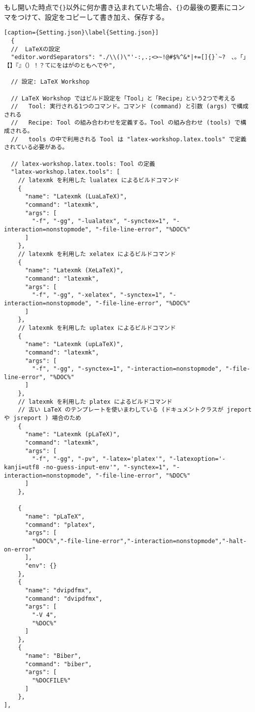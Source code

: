 \documentclass{ltjsarticle}
\begin{document}
もし開いた時点で\verb|{}|以外に何か書き込まれていた場合、\verb|{}|の最後の要素にコンマをつけて、設定をコピーして書き加え、保存する。
\begin{lstlisting}[caption={Setting.json}\label{Setting.json}]
  {
  //  LaTeXの設定
  "editor.wordSeparators": "./\\()\"'-:,.;<>~!@#$%^&*|+=[]{}`~?　、。「」【】『』（）！？てにをはがのともへでや",

  // 設定: LaTeX Workshop

  // LaTeX Workshop ではビルド設定を「Tool」と「Recipe」という2つで考える
  //   Tool: 実行される1つのコマンド。コマンド (command) と引数 (args) で構成される
  //   Recipe: Tool の組み合わわせを定義する。Tool の組み合わせ (tools) で構成される。
  //   tools の中で利用される Tool は "latex-workshop.latex.tools" で定義されている必要がある。
  
  // latex-workshop.latex.tools: Tool の定義
  "latex-workshop.latex.tools": [
    // latexmk を利用した lualatex によるビルドコマンド
    {
      "name": "Latexmk (LuaLaTeX)",
      "command": "latexmk",
      "args": [
        "-f", "-gg", "-lualatex", "-synctex=1", "-interaction=nonstopmode", "-file-line-error", "%DOC%"
      ]
    },
    // latexmk を利用した xelatex によるビルドコマンド
    {
      "name": "Latexmk (XeLaTeX)",
      "command": "latexmk",
      "args": [
        "-f", "-gg", "-xelatex", "-synctex=1", "-interaction=nonstopmode", "-file-line-error", "%DOC%"
      ]
    },
    // latexmk を利用した uplatex によるビルドコマンド
    {
      "name": "Latexmk (upLaTeX)",
      "command": "latexmk",
      "args": [
        "-f", "-gg", "-synctex=1", "-interaction=nonstopmode", "-file-line-error", "%DOC%"
      ]
    },
    // latexmk を利用した platex によるビルドコマンド
    // 古い LaTeX のテンプレートを使いまわしている (ドキュメントクラスが jreport や jsreport ) 場合のため
    {
      "name": "Latexmk (pLaTeX)",
      "command": "latexmk",
      "args": [
        "-f", "-gg", "-pv", "-latex='platex'", "-latexoption='-kanji=utf8 -no-guess-input-env'", "-synctex=1", "-interaction=nonstopmode", "-file-line-error", "%DOC%"
      ]
    },

    {
      "name": "pLaTeX",
      "command": "platex",
      "args": [
        "%DOC%","-file-line-error","-interaction=nonstopmode","-halt-on-error"
      ],
      "env": {}
    },
    {
      "name": "dvipdfmx",
      "command": "dvipdfmx",
      "args": [
        "-V 4",
        "%DOC%"
      ]
    },
    {
      "name": "Biber",
      "command": "biber",
      "args": [
        "%DOCFILE%"
      ]
    },
],


\end{lstlisting}
\end{document}
